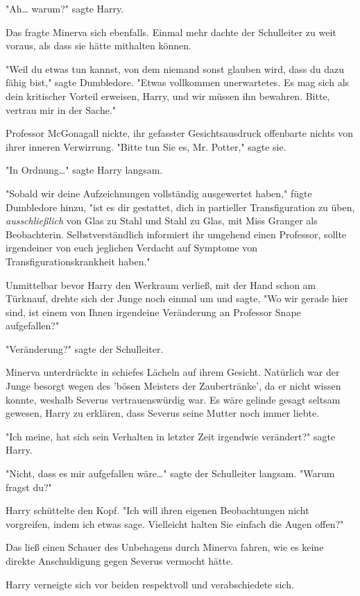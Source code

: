 {"Ah… warum?" sagte Harry.

Das fragte Minerva sich ebenfalls. Einmal mehr dachte der Schulleiter zu weit voraus, als dass sie hätte mithalten können.

"Weil du etwas tun kannst, von dem niemand sonst glauben wird, dass du dazu fähig bist," sagte Dumbledore. "Etwas vollkommen unerwartetes. Es mag sich als dein kritischer Vorteil erweisen, Harry, und wir müssen ihn bewahren. Bitte, vertrau mir in der Sache."

Professor McGonagall nickte, ihr gefasster Gesichtsausdruck offenbarte nichts von ihrer inneren Verwirrung. "Bitte tun Sie es, Mr. Potter," sagte sie.

"In Ordnung…" sagte Harry langsam.

"Sobald wir deine Aufzeichnungen vollständig ausgewertet haben," fügte Dumbledore hinzu, "ist es dir gestattet, dich in partieller Transfiguration zu üben, \emph{ausschließlich} von Glas zu Stahl und Stahl zu Glas, mit Miss Granger als Beobachterin. Selbstverständlich informiert ihr umgehend einen Professor, sollte irgendeiner von euch jeglichen Verdacht auf Symptome von Transfigurationskrankheit haben."

Unmittelbar bevor Harry den Werkraum verließ, mit der Hand schon am Türknauf, drehte sich der Junge noch einmal um und sagte, "Wo wir gerade hier sind, ist einem von Ihnen irgendeine Veränderung an Professor Snape aufgefallen?"

"Veränderung?" sagte der Schulleiter.

Minerva unterdrückte in schiefes Lächeln auf ihrem Gesicht. Natürlich war der Junge besorgt wegen des 'bösen Meisters der Zaubertränke', da er nicht wissen konnte, weshalb Severus vertrauenswürdig war. Es wäre gelinde gesagt seltsam gewesen, Harry zu erklären, dass Severus seine Mutter noch immer liebte.

"Ich meine, hat sich sein Verhalten in letzter Zeit irgendwie verändert?" sagte Harry.

"Nicht, dass es mir aufgefallen wäre…" sagte der Schulleiter langsam. "Warum fragst du?"

Harry schüttelte den Kopf. "Ich will ihren eigenen Beobachtungen nicht vorgreifen, indem ich etwas sage. Vielleicht halten Sie einfach die Augen offen?"

Das ließ einen Schauer des Unbehagens durch Minerva fahren, wie es keine direkte Anschuldigung gegen Severus vermocht hätte.

Harry verneigte sich vor beiden respektvoll und verabschiedete sich.

}
